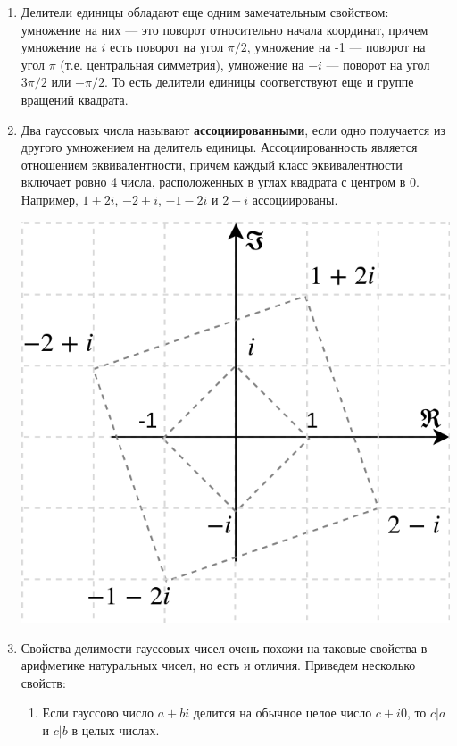 \begin{enumerate}
\item Делители единицы обладают еще одним замечательным свойством: умножение на них --- это поворот относительно начала координат, причем умножение на $i$ есть поворот на угол $\pi/2$, умножение на -1 --- поворот на угол $\pi$ (т.е. центральная симметрия), умножение на $-i$ --- поворот на угол $3\pi/2$ или $-\pi/2$. То есть делители единицы соответствуют еще и группе вращений квадрата.


\item Два гауссовых числа называют \textbf{ассоциированными}, если одно получается из другого умножением на делитель единицы. Ассоциированность является отношением эквивалентности, причем каждый класс эквивалентности включает ровно 4 числа, расположенных в углах квадрата с центром в 0. Например, $1+2i$, $-2+i$, $-1-2i$ и $2-i$ ассоциированы.
\begin{center}
\includegraphics[scale=0.35]{Gaussian.png}
\end{center}

\item Свойства делимости гауссовых чисел очень похожи на таковые свойства в арифметике натуральных чисел, но есть и отличия.
Приведем несколько свойств:
\begin{enumerate}
\item Если гауссово число $a+bi$ делится на обычное целое число $c+i0$, то $c|a$ и $c|b$ в целых числах.


\end{enumerate}
\end{enumerate}
